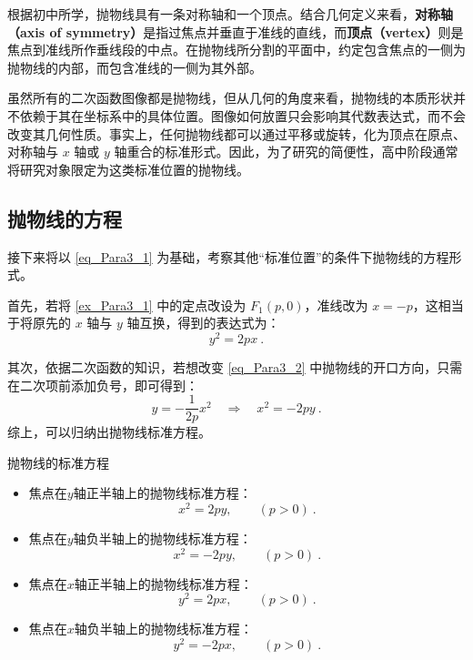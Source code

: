 根据初中所学，抛物线具有一条对称轴和一个顶点。结合几何定义来看，\textbf{对称轴（axis of symmetry）}是指过焦点并垂直于准线的直线，而\textbf{顶点（vertex）}则是焦点到准线所作垂线段的中点。在抛物线所分割的平面中，约定包含焦点的一侧为抛物线的内部，而包含准线的一侧为其外部。

虽然所有的二次函数图像都是抛物线，但从几何的角度来看，抛物线的本质形状并不依赖于其在坐标系中的具体位置。图像如何放置只会影响其代数表达式，而不会改变其几何性质。事实上，任何抛物线都可以通过平移或旋转，化为顶点在原点、对称轴与 $x$ 轴或 $y$ 轴重合的标准形式。因此，为了研究的简便性，高中阶段通常将研究对象限定为这类标准位置的抛物线。

\subsection{抛物线的方程}

接下来将以 \autoref{eq_Para3_1} 为基础，考察其他“标准位置”的条件下抛物线的方程形式。

首先，若将 \autoref{ex_Para3_1} 中的定点改设为 $F_1(p,0)$，准线改为 $x = -p$，这相当于将原先的 $x$ 轴与 $y$ 轴互换，得到的表达式为：
\begin{equation}
y^2 = 2px~.
\end{equation}

其次，依据二次函数的知识，若想改变 \autoref{eq_Para3_2} 中抛物线的开口方向，只需在二次项前添加负号，即可得到：
\begin{equation}
y = -\frac{1}{2p}x^2 \quad \Longrightarrow \quad x^2 = -2py~.
\end{equation}
综上，可以归纳出抛物线标准方程。

\begin{theorem}{抛物线的标准方程}\label{the_Para3_1}
\begin{itemize}
\item 焦点在$y$轴正半轴上的抛物线标准方程：
\begin{equation}
x^2=2py,\qquad(p>0)~.
\end{equation}
\item 焦点在$y$轴负半轴上的抛物线标准方程：
\begin{equation}
x^2=-2py,\qquad(p>0)~.
\end{equation}
\item 焦点在$x$轴正半轴上的抛物线标准方程：
\begin{equation}\label{eq_Para3_3}
y^2=2px,\qquad(p>0)~.
\end{equation}
\item 焦点在$x$轴负半轴上的抛物线标准方程：
\begin{equation}
y^2=-2px,\qquad(p>0)~.
\end{equation}
\end{itemize}
\end{theorem}

